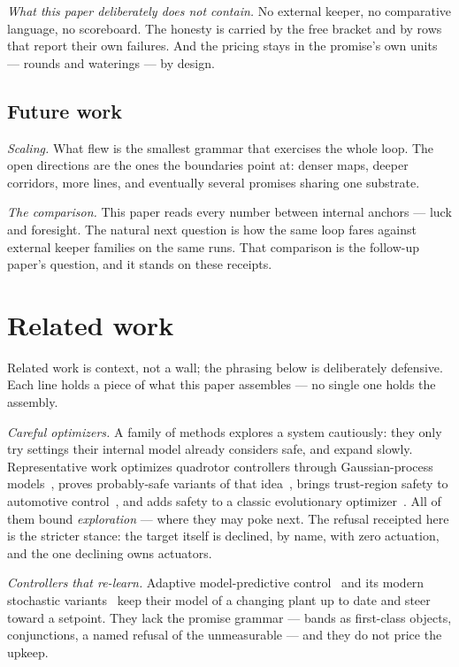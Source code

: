 \documentclass[11pt,a4paper]{article}
\begin{document}
\emph{What this paper deliberately does not contain.} No external
keeper, no comparative language, no scoreboard. The honesty is
carried by the free bracket and by rows that report their own
failures. And the pricing stays in the promise's own units ---
rounds and waterings --- by design.

\subsection*{Future work}

\emph{Scaling.} What flew is the smallest grammar that exercises
the whole loop. The open directions are the ones the boundaries
point at: denser maps, deeper corridors, more lines, and
eventually several promises sharing one substrate.

\emph{The comparison.} This paper reads every number between
internal anchors --- luck and foresight. The natural next question
is how the same loop fares against external keeper families on the
same runs. That comparison is the follow-up paper's question, and
it stands on these receipts.

\section{Related work}
\label{sec:related}

Related work is context, not a wall; the phrasing below is
deliberately defensive. Each line holds a piece of what this paper
assembles --- no single one holds the assembly.

\emph{Careful optimizers.} A family of methods explores a system
cautiously: they only try settings their internal model already
considers safe, and expand slowly. Representative work optimizes
quadrotor controllers through Gaussian-process models~\cite{berkenkamp2015},
proves probably-safe variants of that
idea~\cite{tokmak2024}, brings trust-region safety to automotive
control~\cite{menn2025}, and adds safety to a classic evolutionary
optimizer~\cite{uchida2024}. All of them bound \emph{exploration} ---
where they may poke next. The refusal receipted here is the stricter
stance: the target itself is declined, by name, with zero actuation,
and the one declining owns actuators.

\emph{Controllers that re-learn.} Adaptive model-predictive
control~\cite{tanaskovic2017} and its modern stochastic
variants~\cite{knaup2024} keep their model of a changing plant up to
date and steer toward a setpoint. They lack the promise grammar ---
bands as first-class objects, conjunctions, a named refusal of the
unmeasurable --- and they do not price the upkeep.
\end{document}
